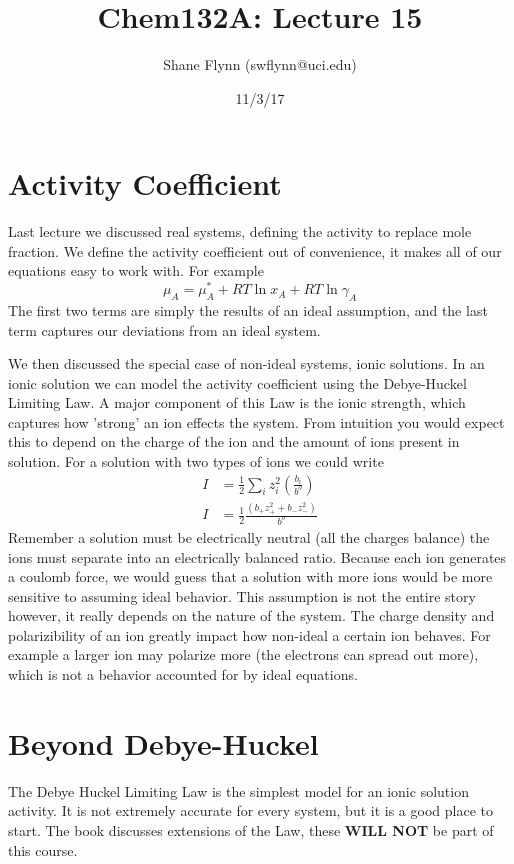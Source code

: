\documentclass{article}
\title{Chem132A: Lecture 15}
\author{Shane Flynn (swflynn@uci.edu)}
\date{11/3/17}
\newcommand{\be}{\begin{equation}}
\newcommand{\ee}{\end{equation}}
\begin{document}
\maketitle

\section*{Activity Coefficient}
Last lecture we discussed real systems, defining the activity to replace mole fraction.
We define the activity coefficient out of convenience, it makes all of our equations easy to work with.
For example 
\be
\mu_A = \mu_A^* + RT\ln x_A + RT \ln \gamma_A
\ee
The first two terms are simply the results of an ideal assumption, and the last term captures our deviations from an ideal system.

We then discussed the special case of non-ideal systems, ionic solutions.
In an ionic solution we can model the activity coefficient using the Debye-Huckel Limiting Law.
A major component of this Law is the ionic strength, which captures how 'strong' an ion effects the system.
From intuition you would expect this to depend on the charge of the ion and the amount of ions present in solution. 
For a solution with two types of ions  we could write
\be
\begin{split}
I &= \frac{1}{2}\sum_i z_i^2 \left( \frac{b_i}{b^o}\right) \\
I &= \frac{1}{2}\frac{\left(b_+z_+^2 + b_-z_-^2\right)}{b^o}
\end{split}
\ee
Remember a solution must be electrically neutral (all the charges balance) the ions must separate into an electrically balanced ratio. 
Because each ion generates a coulomb force, we would guess that a solution with more ions would be more sensitive to assuming ideal behavior.
This assumption is not the entire story however, it really depends on the nature of the system.
The charge density and polarizibility of an ion greatly impact  how non-ideal a certain ion behaves. 
For example a larger ion may polarize more (the electrons can spread out more), which is not a behavior accounted for by ideal equations. 

\section*{Beyond Debye-Huckel}
The Debye Huckel Limiting Law is the simplest model for an ionic solution activity.
It is not extremely accurate for every system, but it is a good place to start.
The book discusses extensions of the Law, these \textbf{WILL NOT} be part of this course.
\end{document}
